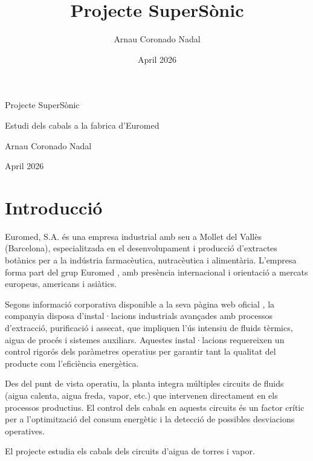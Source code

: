 \documentclass[11pt]{article}
\title{Projecte SuperSònic}
\author{Arnau Coronado Nadal}
\date{April 2026}
\begin{document}
\begin{center}
    \vspace*{3cm}

    {\Huge Projecte SuperSònic}

    \vspace{1cm}
    {\Large Estudi dels cabals a la fabrica d'Euromed}

    \vspace{2cm}
    {\large Arnau Coronado Nadal}

    \vspace{1cm}
    {\normalsize April 2026}
\end{center}

\thispagestyle{emptystyle}
\newpage

\thispagestyle{emptystyle}
\renewcommand{\contentsname}{Taula de continguts}
\tableofcontents
\newpage


\section{Introducció}

Euromed, S.A. és una empresa industrial amb seu a Mollet del Vallès (Barcelona), especialitzada en el desenvolupament i producció d'extractes botànics per a la indústria farmacèutica, nutracèutica i alimentària.
L'empresa forma part del grup Euromed \cite{Euromed2024}, amb presència internacional i orientació a mercats europeus, americans i asiàtics.

Segons informació corporativa disponible a la seva pàgina web oficial \cite{Euromed2024}, la companyia disposa d'instal·lacions industrials avançades amb processos d'extracció, purificació i assecat, que impliquen l'ús intensiu de fluids tèrmics, aigua de procés i sistemes auxiliars. Aquestes
instal·lacions requereixen un control rigorós dels paràmetres operatius per garantir tant la qualitat del producte com l'eficiència energètica.

Des del punt de vista operatiu, la planta integra múltiples circuits de fluids (aigua calenta, aigua freda, vapor, etc.) que intervenen directament en els processos productius. El control dels cabals en aquests circuits és un factor crític per a l'optimització del consum energètic i la detecció de possibles desviacions operatives.

El projecte estudia els cabals dels circuits d'aigua de torres i vapor.
\end{document}
